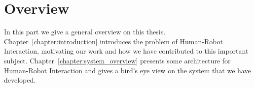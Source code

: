 \part{Overview}

In this part we give a general overview on this thesis. Chapter~\ref{chapter:introduction} introduces the problem of Human-Robot Interaction, motivating our work and how we have contributed to this important subject. Chapter~\ref{chapter:system_overview} presents some architecture for Human-Robot Interaction and gives a bird's eye view on the system that we have developed.




